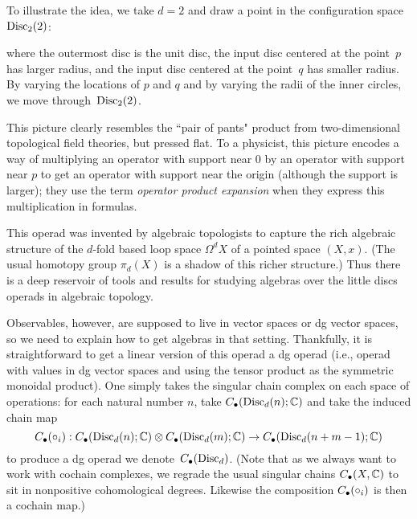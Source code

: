 \documentclass[11pt]{amsart}
\begin{document}
To illustrate the idea, we take $d=2$ and draw a point in the configuration space~${\rm Disc}_2(2)$:
\begin{center}
\end{center}
where the outermost disc is the unit disc,
the input disc centered at the point~$p$ has larger radius, 
and the input disc centered at the point~$q$ has smaller radius.
By varying the locations of $p$ and $q$ and by varying the radii of the inner circles,
we move through~${\rm Disc}_2(2)$.

This picture clearly resembles the ``pair of pants" product from two-dimensional topological field theories, but pressed flat.
To a physicist, this picture encodes a way of multiplying an operator with support near 0 by an operator with support near $p$ to get an operator with support near the origin (although the support is larger);
they use the term {\em operator product expansion} when they express this multiplication in formulas.

This operad was invented by algebraic topologists to capture the rich algebraic structure of the $d$-fold based loop space $\Omega^d X$ of a pointed space $(X,x)$.
(The usual homotopy group $\pi_d(X)$ is a shadow of this richer structure.)
Thus there is a deep reservoir of tools and results for studying algebras over the little discs operads in algebraic topology.

Observables, however, are supposed to live in vector spaces or dg vector spaces,
so we need to explain how to get algebras in that setting.
Thankfully, it is straightforward to get a linear version of this operad a dg operad (i.e., operad with values in dg vector spaces and using the tensor product as the symmetric monoidal product).
One simply takes the singular chain complex on each space of operations:
for each natural number $n$, take $C_\bullet({\rm Disc}_d(n); \mathbb C)$ and take the induced chain map 
\[
C_\bullet(\circ_i): C_\bullet({\rm Disc}_d(n); \mathbb C) \otimes C_\bullet({\rm Disc}_d(m); \mathbb C) \to C_\bullet({\rm Disc}_d(n+m-1); \mathbb C)
\]
to produce a dg operad we denote~$C_\bullet({\rm Disc}_d)$.
(Note that as we always want to work with cochain complexes, we regrade the usual singular chains $C_\bullet(X, \mathbb C)$ to sit in nonpositive cohomological degrees. 
Likewise the composition $C_\bullet(\circ_i)$ is then a cochain map.)
\end{document}
